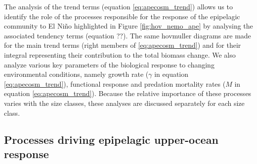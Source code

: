 The analysis of the trend terms (equation \ref{eq:apecosm_trend}) allows us to identify the role of the processes responsible for the response of the epipelagic community to El Niño highlighted in Figure \ref{fig:hov_nemo_ape} by analysing the associated tendency terms (equation ??). The same hovmuller diagrams are made for the main trend terms (right members of \ref{eq:apecosm_trend}) and for their integral representing their contribution to the total biomass change. We also analyze various key parameters of the biological response to changing environmental conditions, namely growth rate ($\gamma$ in equation \ref{eq:apecosm_trend}), functional response and predation mortality rates ($M$ in equation \ref{eq:apecosm_trend}). Because the relative importance of these processes varies with the size classes, these analyses are discussed separately for each size class.

\subsection{Processes driving epipelagic upper-ocean response}

